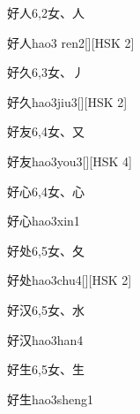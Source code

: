 \begin{entry}{好人}{6,2}{⼥、⼈}
  \begin{phonetics}{好人}{hao3 ren2}[][HSK 2]
  \end{phonetics}
\end{entry}

\begin{entry}{好久}{6,3}{⼥、⼃}
  \begin{phonetics}{好久}{hao3jiu3}[][HSK 2]
  \end{phonetics}
\end{entry}

\begin{entry}{好友}{6,4}{⼥、⼜}
  \begin{phonetics}{好友}{hao3you3}[][HSK 4]
  \end{phonetics}
\end{entry}

\begin{entry}{好心}{6,4}{⼥、⼼}
  \begin{phonetics}{好心}{hao3xin1}
  \end{phonetics}
\end{entry}

\begin{entry}{好处}{6,5}{⼥、⼡}
  \begin{phonetics}{好处}{hao3chu4}[][HSK 2]
  \end{phonetics}
\end{entry}

\begin{entry}{好汉}{6,5}{⼥、⽔}
  \begin{phonetics}{好汉}{hao3han4}
  \end{phonetics}
\end{entry}

\begin{entry}{好生}{6,5}{⼥、⽣}
  \begin{phonetics}{好生}{hao3sheng1}
  \end{phonetics}
\end{entry}

